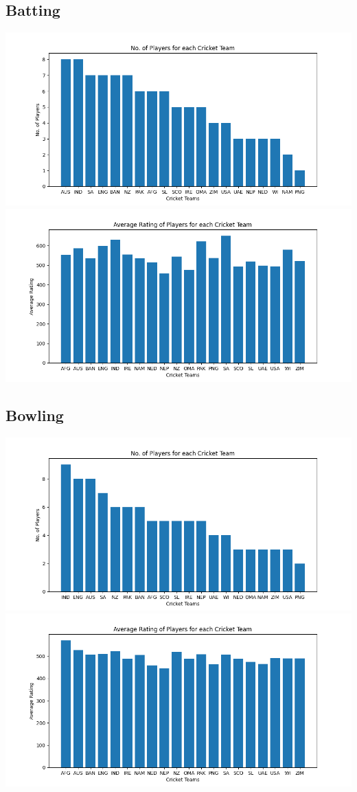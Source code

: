 \documentclass{article}
\begin{document}
\begin{normalsize}
            \subsection{Batting}\label{subsec:batting2}
                \includegraphics[scale=0.75]{odi_batting_3-10-2023-1}
                \includegraphics[scale=0.75]{odi_batting_3-10-2023-2}
            \subsection{Bowling}\label{subsec:bowling2}
                \includegraphics[scale=0.75]{odi_bowling_3-10-2023-1}
                \includegraphics[scale=0.75]{odi_bowling_3-10-2023-2}

\end{normalsize}
\end{document}
